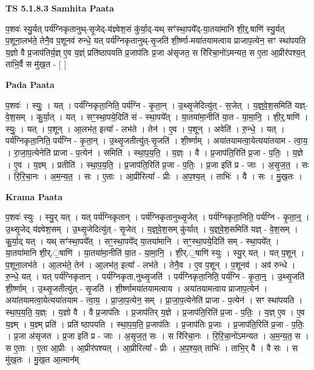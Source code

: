 \documentclass[17pt]{extarticle}
\begin{document}
\textbf{TS 5.1.8.3 } \newline
\textbf{Samhita Paata} \newline

प॒शवः॑ स्यु॒र्यत् पर्य॑ग्निकृतानुथ्-सृ॒जेद्-य॑ज्ञ्वेश॒सं कु॑र्या॒द्-यथ् सꣳ॑स्था॒पये᳚द्-या॒तया॑मानि शी॒र्॒.षाणि॑ स्यु॒र्यत् प॒शूना॒लभ॑ते॒ तेनै॒व प॒शूनव॑ रुन्धे॒ यत् पर्य॑ग्निकृतानुथ्-सृ॒जति॑ शी॒र्ष्णा-मया॑तयामत्वाय प्राजाप॒त्येन॒ सꣳ स्था॑पयति य॒ज्ञो वै प्र॒जाप॑तिर्य॒ज्ञ् ए॒व य॒ज्ञ्ं प्रति॑ष्ठापयति प्र॒जाप॑तिः प्र॒जा अ॑सृजत॒ स रि॑रिचा॒नो॑ऽमन्यत॒ स ए॒ता आ॒प्रीर॑पश्य॒त् ताभि॒र्वै स मु॑ख॒त - [  ] \newline

\textbf{Pada Paata} \newline

प॒शवः॑ । स्युः॒ । यत् । पर्य॑ग्निकृता॒निति॒ पर्य॑ग्नि - कृ॒ता॒न् । उ॒थ्सृ॒जेदित्यु॑त् - स॒जेत् । य॒ज्ञ्॒वे॒श॒समिति॑ यज्ञ्-वे॒श॒सम् । कु॒र्या॒त् । यत् । सꣳ॒॒स्था॒पये॒दिति॑ सं - स्था॒पये᳚त् । या॒तया॑मा॒नीति॑ या॒त - या॒मा॒नि॒ । शी॒र्॒.षाणि॑ । स्युः॒ । यत् । प॒शून् । आ॒लभ॑त॒ इत्या᳚ - लभ॑ते । तेन॑ । ए॒व । प॒शून् । अवेति॑ । रु॒न्धे॒ । यत् । पर्य॑ग्निकृता॒निति॒ पर्य॑ग्नि - कृ॒ता॒न् । उ॒थ्सृ॒जतीत्यु॑त्-सृ॒जति॑ । शी॒र्ष्णाम् । अया॑तयामत्वा॒येत्यया॑तयाम - त्वा॒य॒ । रा॒जा॒प॒त्येनेति॑ प्राजा - प॒त्येन॑ । समिति॑ । स्था॒प॒य॒ति॒ । य॒ज्ञ्ः । वै । प्र॒जाप॑ति॒रिति॑ प्र॒जा - प॒तिः॒ । य॒ज्ञे । ए॒व । य॒ज्ञ्म् । प्रतीति॑ । स्था॒प॒य॒ति॒ । प्र॒जाप॑ति॒रिति॑ प्र॒जा - प॒तिः॒ । प्र॒जा इति॑ प्र - जाः । अ॒सृ॒ज॒त॒ । सः । रि॒रि॒चा॒नः । अ॒म॒न्य॒त॒ । सः । ए॒ताः । आ॒प्रीरित्या᳚ - प्रीः । अ॒प॒श्य॒त् । ताभिः॑ । वै । सः । मु॒ख॒तः ।  \newline


\textbf{Krama Paata} \newline

प॒शवः॑ स्युः । स्यु॒र् यत् । यत् पर्य॑ग्निकृतान् । पर्य॑ग्निकृतानुथ्सृ॒जेत् । पर्य॑ग्निकृता॒निति॒ पर्य॑ग्नि - कृ॒ता॒न्॒ । उ॒थ्सृ॒जेद् य॑ज्ञ्वेश॒सम् । उ॒थ्सृ॒जेदित्यु॑त् - सृ॒जेत् । य॒ज्ञ्॒वे॒श॒सम् कु॑र्यात् । य॒ज्ञ्॒वे॒श॒समिति॑ यज्ञ् - वे॒श॒सम् । कु॒र्या॒द् यत् । यथ् सꣳ॑स्था॒पये᳚त् । सꣳ॒॒स्था॒पये᳚द् या॒तया॑मानि । सꣳ॒॒स्था॒पये॒दिति॑ सम् - स्था॒पये᳚त् । या॒तया॑मानि शी॒र्.॒षाणि॑ । या॒तया॑मा॒नीति॑ या॒त - या॒मा॒नि॒ । शी॒र्.॒षाणि॑ स्युः । स्यु॒र् यत् । यत् प॒शून् । प॒शूना॒लभ॑ते । आ॒लभ॑ते॒ तेन॑ । आ॒लभ॑त॒ इत्या᳚ - लभ॑ते । तेनै॒व । ए॒व प॒शून् । प॒शूनव॑ । अव॑ रुन्धे । रु॒न्धे॒ यत् । यत् पर्य॑ग्निकृतान् । पर्य॑ग्निकृता,नुथ्सृ॒जति॑ । पर्य॑ग्निकृता॒निति॒ पर्य॑ग्नि - कृ॒ता॒न्॒ । उ॒थ्सृ॒जति॑ शी॒र्ष्णाम् । उ॒थ्सृ॒जतीत्यु॑त् - सृ॒जति॑ । शी॒र्ष्णामया॑तयामत्वाय । अया॑तयामत्वाय प्राजाप॒त्येन॑ । अया॑तयामत्वा॒येत्यया॑तयाम - त्वा॒य॒ । प्रा॒जा॒प॒त्येन॒ सम् । प्रा॒जा॒प॒त्येनेति॑ प्राजा - प॒त्येन॑ । सꣳ स्था॑पयति । स्था॒प॒य॒ति॒ य॒ज्ञ्ः । य॒ज्ञो वै । वै प्र॒जाप॑तिः । प्र॒जाप॑तिर् य॒ज्ञे । प्र॒जाप॑ति॒रिति॑ प्र॒जा - प॒तिः॒ । य॒ज्ञ् ए॒व । ए॒व य॒ज्ञ्म् । य॒ज्ञ्म् प्रति॑ । प्रति॑ ष्ठापयति । स्था॒प॒य॒ति॒ प्र॒जाप॑तिः । प्र॒जाप॑तिः प्र॒जाः । प्र॒जाप॑ति॒रिति॑ प्र॒जा - प॒तिः॒ । प्र॒जा अ॑सृजत । प्र॒जा इति॑ प्र - जाः । अ॒सृ॒ज॒त॒ सः । स रि॑रिचा॒नः । रि॒रि॒चा॒नो॑ऽमन्यत । अ॒म॒न्य॒त॒ स । स ए॒ताः । ए॒ता आ॒प्रीः । आ॒प्रीर॑पश्यत् । आ॒प्रीरित्या᳚ - प्रीः । अ॒प॒श्य॒त् ताभिः॑ । ताभि॒र् वै । वै सः । स मु॑ख॒तः । मु॒ख॒त आ॒त्मान᳚म् \newline
\end{document}
